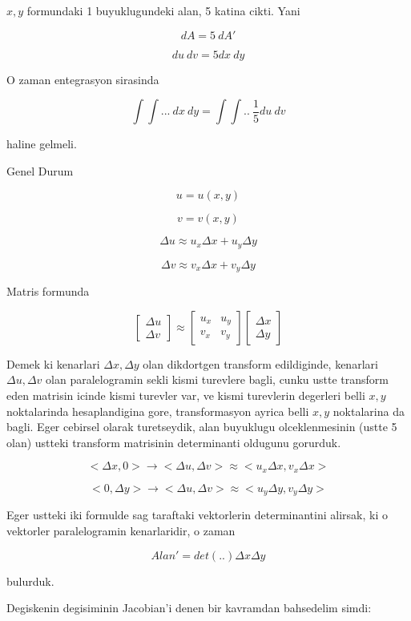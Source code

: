 \documentclass[12pt,fleqn]{article}
\begin{document}
$x,y$ formundaki 1 buyuklugundeki alan, 5 katina cikti. Yani 

\[ dA = 5 \ dA' \]

\[ du \ dv = 5 dx \ dy \]

O zaman entegrasyon sirasinda 

\[ \int \int ... \ dx \ dy = \int \int .. \ \frac{1}{5} du \ dv \]

haline gelmeli. 

Genel Durum 

\[ u = u(x,y) \]

\[ v = v(x,y)  \]

\[ \Delta u \approx u_x \Delta x + u_y \Delta y  \]

\[ \Delta v \approx v_x \Delta x + v_y \Delta y  \]

Matris formunda 

\[ 
\left[\begin{array}{r}
\Delta u \\
\Delta v 
\end{array}\right] \approx 
\left[\begin{array}{rr}
u_x & u_y \\
v_x & v_y
\end{array}\right] 
\left[\begin{array}{r}
\Delta x \\
\Delta y 
\end{array}\right] 
 \]

Demek ki kenarlari $\Delta x,\Delta y$ olan dikdortgen transform
edildiginde, kenarlari $\Delta u,\Delta v$ olan paralelogramin sekli kismi
turevlere bagli, cunku ustte transform eden matrisin icinde kismi turevler
var, ve kismi turevlerin degerleri belli $x,y$ noktalarinda hesaplandigina
gore, transformasyon ayrica belli $x,y$ noktalarina da bagli. Eger cebirsel
olarak turetseydik, alan buyuklugu olceklenmesinin (ustte 5 olan) ustteki
transform matrisinin determinanti oldugunu gorurduk. 

\[<\Delta x,0> \to <\Delta u, \Delta v> \approx <u_x \Delta x, v_x\Delta x> \]

\[ <0, \Delta y> \to <\Delta u,\Delta v> \approx <u_y\Delta y,v_y \Delta y> \]

Eger ustteki iki formulde sag taraftaki vektorlerin determinantini alirsak,
ki o vektorler paralelogramin kenarlaridir, o zaman 

\[ Alan' =  det(..)\Delta x \Delta y  \]

bulurduk. 

Degiskenin degisiminin Jacobian'i denen bir kavramdan bahsedelim simdi: 
\end{document}
